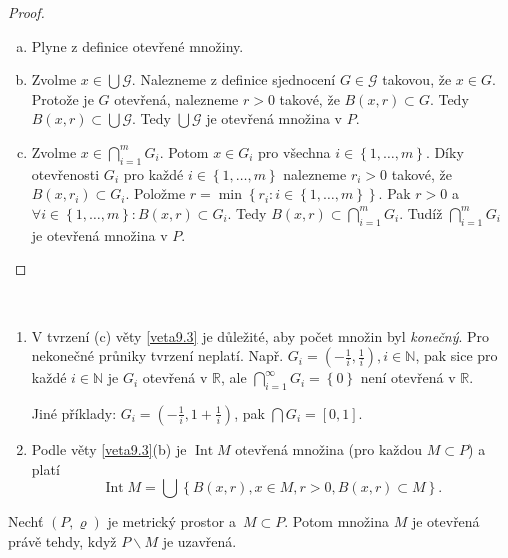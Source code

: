 \begin{proof}
	\,
	\begin{enumerate}[(a)]
		\item Plyne z definice otevřené množiny.
		\item Zvolme $x \in \bigcup \mathcal G$. Nalezneme z definice sjednocení $G\in \mathcal G$
		takovou, že $ x\in G$. Protože je $G$ otevřená, nalezneme $r>0$ takové, že $B(x,r) \subset G$.
		Tedy $B(x,r) \subset \bigcup \mathcal G$. Tedy $\bigcup \mathcal G$ je otevřená množina v $P$.
		\item Zvolme $x \in \bigcap_{i=1}^m G_i$. Potom $x \in G_i$ pro všechna $i \in \left \{ 1,\dots,m \right \} $.
		Díky otevřenosti $G_i$ pro každé $i\in \left \{ 1,\dots, m \right \} $ nalezneme $r_i>0$
    	takové, že $B(x,r_i)\subset G_i$. Položme $r=\min \left \{ r_i:i \in \left \{ 1,\dots,m \right \}  \right \} $.
        Pak $r>0$ a $\forall i \in \left \{ 1,\dots,m \right \}: B(x,r)\subset G_i $. Tedy
        $B(x,r)\subset \bigcap_{i=1}^m G_i$. Tudíž $\bigcap_{i=1}^m G_i$ je otevřená množina v $P$.\qedhere
	\end{enumerate}
\end{proof}

\begin{poznamka}\,
\begin{enumerate}[(1)]
	\item V tvrzení (c) věty \ref{veta9.3} je důležité, aby počet množin byl \emph{konečný}. Pro
	nekonečné průniky tvrzení neplatí. Např. $G_i = \left( -\frac{1}{i}, \frac{1}{i} \right ), i \in \mathbb N  $,
	pak sice pro každé $i\in \mathbb N $ je $G_i$ otevřená v $\mathbb R $, ale $\bigcap_{i=1}^\infty G_i = \left \{ 0 \right \} $
	není otevřená v $\mathbb R $.
	\par Jiné příklady: $G_i = \left( -\frac{1}{i}, 1+\frac{1}{i} \right ) $, pak $\bigcap G_i = [0,1]$.
	\item Podle věty \ref{veta9.3}(b) je $\operatorname{Int} M$ otevřená množina (pro každou $M\subset P$)
	a platí
	$$
	    \operatorname{Int} M = \bigcup \left \{ B(x,r), x \in M, r>0, B(x,r)\subset M \right \}.
	$$
\end{enumerate}
\end{poznamka}

\begin{veta}\label{veta9.4}
Nechť $(P,\varrho)$ je metrický prostor a~$M\subset P$. Potom množina $M$ je otevřená právě tehdy, když $P\smallsetminus M$ je uzavřená.
\end{veta}

